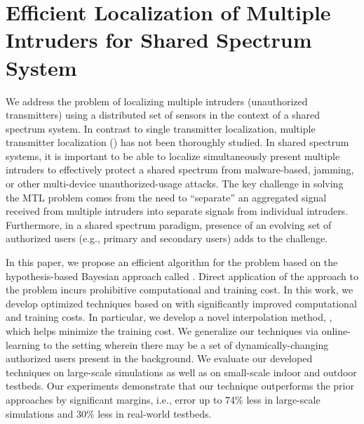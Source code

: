 \chapter{Efficient Localization of Multiple Intruders for Shared Spectrum System}
\label{chap:ipsn}


We address the problem of localizing multiple intruders (unauthorized
transmitters) using a distributed set of sensors in the context of a
shared spectrum system. 
In contrast to single transmitter localization, multiple
transmitter localization (\mtl) has not been thoroughly studied.
In shared spectrum systems, it is important to be able to
localize simultaneously present multiple intruders to effectively
protect a shared spectrum from malware-based, jamming, or other
multi-device unauthorized-usage attacks. The key challenge in solving
the MTL problem comes from the need to ``separate'' an aggregated
signal received from multiple intruders into separate
signals from individual intruders. Furthermore, in a shared spectrum
paradigm, presence of an evolving set of authorized users (e.g.,
primary and secondary users) adds to the challenge.

In this paper, we propose an efficient algorithm for the \mtl problem
based on the hypothesis-based Bayesian approach called
\map. Direct application of the \map approach to
the \mtl problem incurs prohibitive computational and training
cost. In this work, we develop optimized techniques based on \map with
significantly improved computational and training costs. In
particular, we develop a novel interpolation method, \ildw, which helps
minimize the training cost. We generalize our techniques via
online-learning to the setting wherein there may be a set of
dynamically-changing authorized users present in the background.
We evaluate our developed techniques on large-scale simulations as
well as on small-scale indoor and outdoor testbeds. Our experiments
demonstrate that our technique outperforms the prior approaches by
significant margins,  i.e., error up to 74\% less in large-scale simulations and 30\% less in real-world testbeds.










